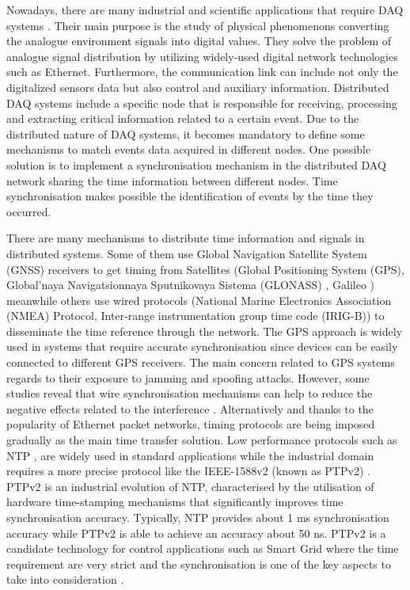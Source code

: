 Nowadays, there are many industrial \cite{daq:res} and scientific applications \cite{daq:sensor-networks} that require DAQ systems \cite{daq:book1}. Their main purpose is the study of physical phenomenons converting the analogue environment signals into digital values. They solve the problem of analogue signal distribution by utilizing  widely-used digital network technologies such as Ethernet. Furthermore, the communication link can include not only the digitalized sensors data but also control and auxiliary information.
Distributed DAQ systems include a specific node that is responsible for receiving, processing and extracting critical information related to a certain event. Due to the distributed nature of DAQ systems, it becomes mandatory to define some mechanisms to match events data acquired in different nodes. One possible solution is to implement a synchronisation mechanism in the distributed DAQ network sharing the time information between different nodes. Time synchronisation makes possible the identification of events by the time they occurred.

There are many mechanisms to distribute time information and signals in distributed systems. Some of them use Global Navigation Satellite System (GNSS) receivers to get timing from Satellites (Global Positioning System (GPS), Global'naya Navigatsionnaya Sputnikovaya Sistema (GLONASS)  \cite{glonass:website}, Galileo \cite{gsa:galileo}) meanwhile others use wired protocols (National Marine Electronics Association (NMEA) Protocol, Inter-range instrumentation group time code (IRIG-B)) to disseminate the time reference through the network. The GPS approach is widely used in systems that require accurate synchronisation since devices can be easily connected to different GPS receivers. The main concern related to GPS systems regards to their exposure to jamming and spoofing attacks. However, some studies reveal that wire synchronisation mechanisms can help to reduce the negative effects related to the interference \cite{NOURA2016130}. Alternatively and thanks to the popularity of Ethernet packet networks, timing protocols are being imposed gradually as the main time transfer solution. Low performance protocols such as NTP \cite{ntf:ntp_std}, are widely used in standard applications while the industrial domain requires a more precise protocol like the IEEE-1588v2 (known as PTPv2) \cite{ieee:ieee1588_std} \cite{itu:TG8275_1_Y_1369_1}. PTPv2 is an industrial evolution of NTP, characterised by the utilisation of hardware time-stamping mechanisms that significantly improves time synchronisation accuracy. Typically, NTP provides about 1 ms synchronisation accuracy while PTPv2 is able to achieve an accuracy about 50 ns. PTPv2 is a candidate technology for control applications such as Smart Grid where the time requirement are very strict and the synchronisation is one of the key aspects to take into consideration \cite{NAFI201623} \cite{COLAK2016396}.

